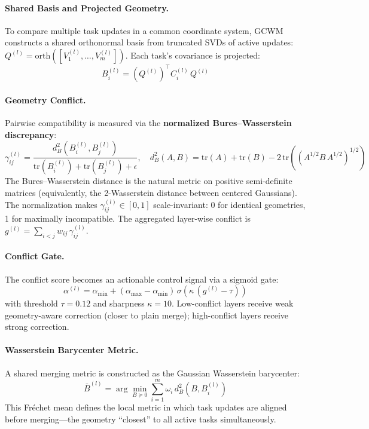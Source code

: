 \documentclass[11pt]{article}
\begin{document}
\paragraph{Shared Basis and Projected Geometry.}
To compare multiple task updates in a common coordinate system, GCWM constructs a shared orthonormal basis from truncated SVDs of active updates: $Q^{(l)} = \mathrm{orth}([V_1^{(l)}, \ldots, V_m^{(l)}])$. Each task's covariance is projected:
\begin{equation}
    B_i^{(l)} = (Q^{(l)})^\top C_i^{(l)}\, Q^{(l)}
\end{equation}

\paragraph{Geometry Conflict.}
Pairwise compatibility is measured via the \textbf{normalized Bures--Wasserstein discrepancy}:
\begin{equation}
    \gamma_{ij}^{(l)} = \frac{d_B^2(B_i^{(l)}, B_j^{(l)})}{\mathrm{tr}(B_i^{(l)}) + \mathrm{tr}(B_j^{(l)}) + \epsilon}, \quad d_B^2(A, B) = \mathrm{tr}(A) + \mathrm{tr}(B) - 2\,\mathrm{tr}\!\left((A^{1/2} B\, A^{1/2})^{1/2}\right)
\end{equation}
The Bures--Wasserstein distance is the natural metric on positive semi-definite matrices (equivalently, the 2-Wasserstein distance between centered Gaussians). The normalization makes $\gamma_{ij}^{(l)} \in [0, 1]$ scale-invariant: 0 for identical geometries, 1 for maximally incompatible. The aggregated layer-wise conflict is $g^{(l)} = \sum_{i<j} w_{ij}\, \gamma_{ij}^{(l)}$.

\paragraph{Conflict Gate.}
The conflict score becomes an actionable control signal via a sigmoid gate:
\begin{equation}
    \alpha^{(l)} = \alpha_{\min} + (\alpha_{\max} - \alpha_{\min})\, \sigma(\kappa\,(g^{(l)} - \tau))
\end{equation}
with threshold $\tau = 0.12$ and sharpness $\kappa = 10$. Low-conflict layers receive weak geometry-aware correction (closer to plain merge); high-conflict layers receive strong correction.

\paragraph{Wasserstein Barycenter Metric.}
A shared merging metric is constructed as the Gaussian Wasserstein barycenter:
\begin{equation}
    \bar{B}^{(l)} = \arg\min_{B \succeq 0} \sum_{i=1}^{m} \omega_i\, d_B^2(B, B_i^{(l)})
\end{equation}
This Fr\'{e}chet mean defines the local metric in which task updates are aligned before merging---the geometry ``closest'' to all active tasks simultaneously.
\end{document}
